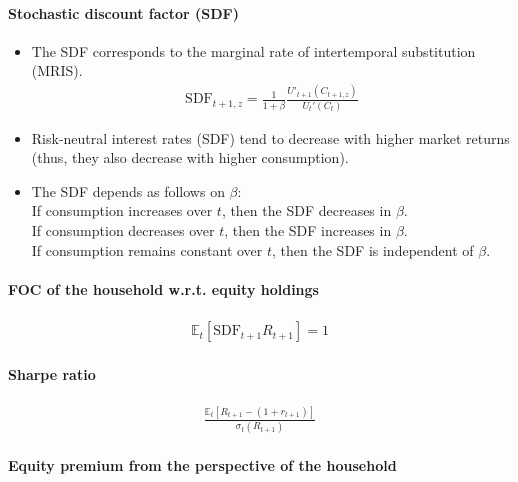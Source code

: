 \documentclass[a4paper,landscape,7pt,fleqn]{scrartcl}
\begin{document}
\begin{multicols*}{3}
\paragraph{Stochastic discount factor (SDF)}

\begin{itemize}
\item The SDF corresponds to the marginal rate of intertemporal substitution (MRIS).
\begin{align*}
\text{SDF}_{t+1,z} = \frac{1}{1+\beta} \frac{U'_{t+1}(C_{t+1,z})}{U_t'(C_t)}
\end{align*}
\item Risk-neutral interest rates (SDF) tend to decrease with higher market returns (thus, they also decrease with higher consumption).
\item The SDF depends as follows on $\beta$: \\
If consumption increases over $t$, then the SDF decreases in $\beta$. \\
If consumption decreases over $t$, then the SDF increases in $\beta$. \\
If consumption remains constant over $t$, then the SDF is independent of $\beta$.
\end{itemize}

\paragraph{FOC of the household w.r.t. equity holdings}

\begin{align*}
\mathbb{E}_t \left[ \text{SDF}_{t+1} R_{t+1} \right] = 1
\end{align*}

\paragraph{Sharpe ratio}

\begin{align*}
\frac{\mathbb{E}_t \left[ R_{t+1} - \left( 1+r_{t+1} \right) \right]}{\sigma_t \left( R_{t+1} \right)}
\end{align*}

\paragraph{Equity premium from the perspective of the household}


\end{multicols*}
\end{document}
